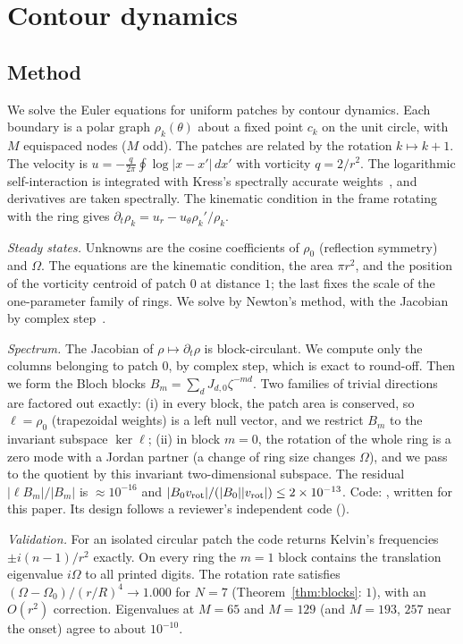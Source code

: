 \documentclass[11pt]{article}
\theoremstyle{definition}
\theoremstyle{remark}
\newcommand{\code}[1]{\path{#1}}
\begin{document}
\section{Contour dynamics}\label{sec:cd}

\subsection{Method}
We solve the Euler equations for uniform patches by contour dynamics. Each boundary is a polar graph
$\rho_k(\theta)$ about a fixed point $c_k$ on the unit circle, with $M$ equispaced nodes ($M$ odd). The patches are related
by the rotation $k\mapsto k+1$. The velocity is $u=-\frac{q}{2\pi}\oint\log|x-x'|\,dx'$ with vorticity $q=2/r^2$. The
logarithmic self-interaction is integrated with Kress's spectrally accurate weights~\cite{Kress2014}, and derivatives are
taken spectrally. The kinematic condition in the frame rotating with the ring gives
$\partial_t\rho_k=u_r-u_\theta\rho_k'/\rho_k$.

\emph{Steady states.} Unknowns are the cosine coefficients of $\rho_0$ (reflection symmetry) and $\Omega$. The equations are
the kinematic condition, the area $\pi r^2$, and the position of the vorticity centroid of patch $0$ at distance $1$; the last
fixes the scale of the one-parameter family of rings. We solve by Newton's method, with the Jacobian by complex
step~\cite{SquireTrapp1998}.

\emph{Spectrum.} The Jacobian of $\rho\mapsto\partial_t\rho$ is block-circulant. We compute only the columns belonging to
patch $0$, by complex step, which is exact to round-off. Then we form the Bloch blocks $B_m=\sum_dJ_{d,0}\zeta^{-md}$. Two
families of trivial directions are factored out exactly:
(i) in every block, the patch area is conserved, so $\ell=\rho_0$ (trapezoidal weights) is a left null vector, and we restrict
$B_m$ to the invariant subspace $\ker\ell$;
(ii) in block $m=0$, the rotation of the whole ring is a zero mode with a Jordan partner (a change of ring size changes
$\Omega$), and we pass to the quotient by this invariant two-dimensional subspace.
The residual $|\ell B_m|/|B_m|$ is $\approx10^{-16}$ and $|B_0v_{\rm rot}|/(|B_0||v_{\rm rot}|)\le2\times10^{-13}$.
Code: \code{code/cd.py}, written for this paper. Its design follows a reviewer's independent code
(\code{code/ngon_reviewer.py}).

\emph{Validation.} For an isolated circular patch the code returns Kelvin's frequencies $\pm i(n-1)/r^2$ exactly. On every
ring the $m=1$ block contains the translation eigenvalue $i\Omega$ to all printed digits. The rotation rate satisfies
$(\Omega-\Omega_0)/(r/R)^4\to1.000$ for $N=7$ (Theorem~\ref{thm:blocks}: $1$), with an $O(r^2)$ correction. Eigenvalues at
$M=65$ and $M=129$ (and $M=193$, $257$ near the onset) agree to about $10^{-10}$.
\end{document}
